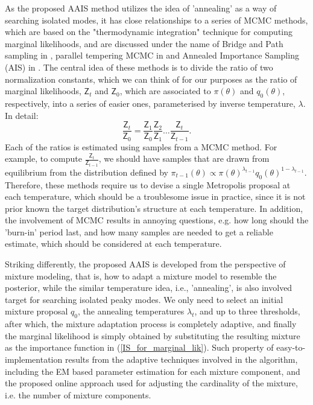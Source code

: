 \documentclass[aoas]{imsart}
\def\Z{\textsf{Z}}
\begin{document}
As the proposed AAIS method utilizes the idea of 'annealing' as a
way of searching isolated modes, it has close relationships to a
series of MCMC methods, which are based on the "thermodynamic
integration" technique for computing marginal likelihoods, and are
discussed under the name of Bridge and Path sampling in
\cite{gelman1998simulating}, parallel tempering MCMC in
\cite{gregory2010bayesian,gregory2005bayesian} and Annealed
Importance Sampling (AIS) in \cite{neal2001ais}. The central idea of
these methods is to divide the ratio of two normalization constants,
which we can think of for our purposes as the ratio of marginal
likelihoods, $\Z_t$ and $\Z_0$, which are associated to
$\pi(\theta)$ and $q_0(\theta)$, respectively, into a series of
easier ones, parameterised by inverse temperature, $\lambda$. In
detail:
\begin{equation}
\frac{\Z_t}{\Z_0}=\frac{\Z_1}{\Z_0}\frac{\Z_2}{\Z_1}\dots\frac{\Z_t}{\Z_{t-1}}.
\end{equation}
Each of the ratios is estimated using samples from a MCMC method.
For example, to compute $\frac{\Z_t}{\Z_{t-1}}$, we should have
samples that are drawn from equilibrium from the distribution
defined by
$\pi_{t-1}(\theta)\propto\pi(\theta)^{\lambda_{t-1}}q_0(\theta)^{1-\lambda_{t-1}}$.
Therefore, these methods require us to devise a single Metropolis
proposal at each temperature, which should be a troublesome issue in
practice, since it is not prior known the target distribution's
structure at each temperature. In addition, the involvement of MCMC
results in annoying questions, e.g. how long should the 'burn-in'
period last, and how many samples are needed to get a reliable
estimate, which should be considered at each temperature.

Striking differently, the proposed AAIS is developed from the
perspective of mixture modeling, that is, how to adapt a mixture
model to resemble the posterior, while the similar temperature idea,
i.e., 'annealing', is also involved target for searching isolated
peaky modes. We only need to select an initial mixture proposal
$q_0$, the annealing temperatures $\lambda_t$, and up to three
thresholds, after which, the mixture adaptation process is
completely adaptive, and finally the marginal likelihood is simply
obtained by substituting the resulting mixture as the importance
function in (\ref{IS_for_marginal_lik}). Such property of
easy-to-implementation results from the adaptive techniques involved
in the algorithm, including the EM based parameter estimation for
each mixture component, and the proposed online approach used for
adjusting the cardinality of the mixture, i.e. the number of mixture
components.
\end{document}
